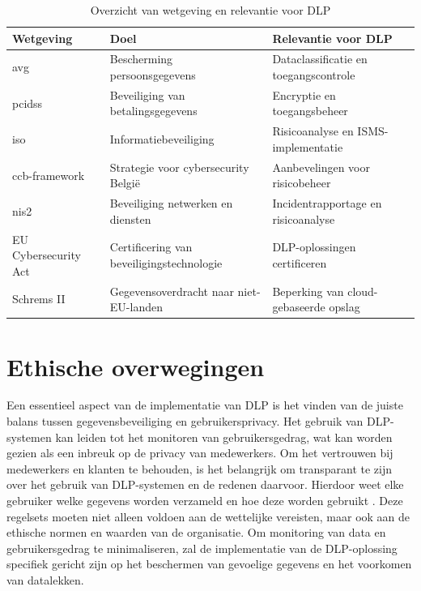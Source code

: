   
  \begin{table}[h]
    \centering
    \small
    \begin{tabular}{p{4cm} p{5cm} p{6cm}}
        \toprule
        \textbf{Wetgeving} & \textbf{Doel} & \textbf{Relevantie voor DLP} \\
        \midrule
        \gls{avg} & Bescherming persoonsgegevens & Dataclassificatie en toegangscontrole \\
        \gls{pcidss} & Beveiliging van betalingsgegevens & Encryptie en toegangsbeheer \\
        \gls{iso} & Informatiebeveiliging & Risicoanalyse en ISMS-implementatie \\
        \gls{ccb}-framework & Strategie voor cybersecurity België & Aanbevelingen voor risicobeheer \\
        \gls{nis2} & Beveiliging netwerken en diensten & Incidentrapportage en risicoanalyse \\
        EU Cybersecurity Act & Certificering van beveiligingstechnologie & DLP-oplossingen certificeren \\
        Schrems II & Gegevensoverdracht naar niet-EU-landen & Beperking van cloud-gebaseerde opslag \\
        \bottomrule
    \end{tabular}
    \caption{Overzicht van wetgeving en relevantie voor DLP}
    \label{tab:wetgeving_dlp}
\end{table}


  

\section{Ethische overwegingen}%

Een essentieel aspect van de implementatie van DLP is het vinden van de juiste balans tussen gegevensbeveiliging en gebruikersprivacy. 
Het gebruik van DLP-systemen kan leiden tot het monitoren van gebruikersgedrag, wat kan worden gezien als een inbreuk op de privacy van medewerkers. 
Om het vertrouwen bij medewerkers en klanten te behouden, is het belangrijk om transparant te zijn over het gebruik van DLP-systemen en de redenen daarvoor. 
Hierdoor weet elke gebruiker welke gegevens worden verzameld en hoe deze worden gebruikt \autocite{Zaini2024}. 
Deze regelsets moeten niet alleen voldoen aan de wettelijke vereisten, maar ook aan de ethische normen en waarden van de organisatie. 
Om monitoring van data en gebruikersgedrag te minimaliseren, 
zal de implementatie van de DLP-oplossing specifiek gericht zijn op het beschermen van gevoelige gegevens en het voorkomen van datalekken. 

